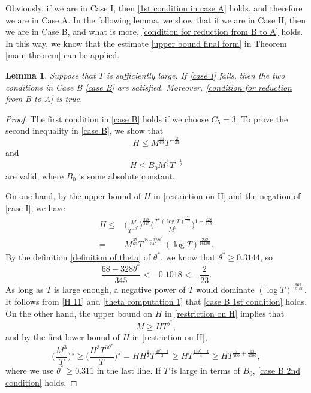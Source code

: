 \documentclass[11pt]{amsart}
\numberwithin{equation}{section}
\newtheorem{lemma}[theorem]{Lemma}
\theoremstyle{definition}
\theoremstyle{proposition}
\begin{document}
Obviously, if we are in Case I, then \eqref{1st condition in case A} holds, and therefore we are in Case A. 
In the following lemma, we show that if we are in Case II, then we are in Case B, and what is more, \eqref{condition for reduction from B to A} holds. In this way, we know that the estimate \eqref{upper bound final form} in Theorem \ref{main theorem} can be applied. 
\begin{lemma}  \label{case B reduction}
Suppose that $T$ is sufficiently large. If \eqref{case I} fails, then the two conditions in Case B \eqref{case B} are satisfied. Moreover, \eqref{condition for reduction from B to A} is true. 
\end{lemma}
\begin{proof}
The first condition in \eqref{case B} holds if we choose $C_5=3$. To prove the second inequality in \eqref{case B}, we show that
\begin{equation}  \label{case B 1st condition}
H\le M^{\frac{35}{69}}T^{-\frac{2}{23}}    
\end{equation}
and 
\begin{equation}   \label{case B 2nd condition}
H\le B_0 M^{\frac{3}{2}}T^{-\frac{1}{2}}    
\end{equation}
are valid, where $B_0$ is some absolute constant.  

On one hand, by the upper bound of $H$ in \eqref{restriction on H} and the negation of \eqref{case I}, we have 
\begin{equation}  \label{H 11}
\begin{split}
H\le & \Big(\frac{M}{T^{-\theta^*}}\Big)^{\frac{328}{345}} \Big(\frac{T^4(\log T)^{\frac{171}{140}}}{M^9}\Big)^{1-\frac{328}{345}}
\\ =& M^{\frac{35}{69}} T^{\frac{68-328\theta^*}{345}}(\log T)^{\frac{969}{16100}}. 
\end{split}    
\end{equation}
By the definition \eqref{definition of theta} of $\theta^*$, we know that $\theta^* \ge 0.3144$, so 
\begin{equation}  \label{theta computation 1}
\frac{68-328\theta^*}{345}<-0.1018 <-\frac{2}{23}.    
\end{equation}
As long as $T$ is large enough, a negative power of $T$ would dominate $(\log T)^{\frac{969}{16100}}$. It follows from \eqref{H 11} and \eqref{theta computation 1} that \eqref{case B 1st condition} holds. \\

On the other hand, the upper bound on $H$ in \eqref{restriction on H} implies that
\[
M \ge HT^{\theta^*},
\]
and by the first lower bound of $H$ in \eqref{restriction on H},
\[
\Big(\frac{M^3}{T}\Big)^{\frac{1}{2}} \ge  \Big(\frac{H^3 T^{3\theta^*}}{T}\Big)^{\frac{1}{2}}    
=H H^{\frac{1}{2}} T^{\frac{3\theta^*-1}{2}} 
 \ge H T^{\frac{13\theta^*-4}{4}}
 \ge  H T^{\frac{3}{400}+\frac{13}{4000}},
\]
where we use $\theta^* \ge 0.311$ in the last line. If $T$ is large in terms of $B_0$,  \eqref{case B 2nd condition} holds. 


\end{proof}
\end{document}
